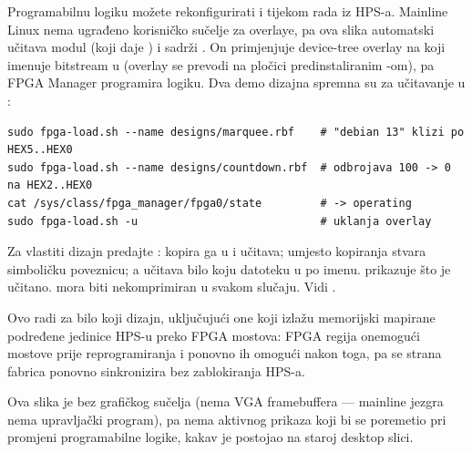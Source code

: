 \begin{note}
Programabilnu logiku možete rekonfigurirati i tijekom rada iz HPS-a. Mainline Linux
nema ugrađeno korisničko sučelje za overlaye, pa ova slika automatski učitava modul
 (koji daje ) i sadrži
. On primjenjuje device-tree overlay na
 koji imenuje bitstream u 
(overlay se prevodi na pločici predinstaliranim -om), pa FPGA Manager
programira logiku. Dva demo dizajna spremna su za učitavanje u
:
\begin{lstlisting}
sudo fpga-load.sh --name designs/marquee.rbf    # "debian 13" klizi po HEX5..HEX0
sudo fpga-load.sh --name designs/countdown.rbf  # odbrojava 100 -> 0 na HEX2..HEX0
cat /sys/class/fpga_manager/fpga0/state         # -> operating
sudo fpga-load.sh -u                            # uklanja overlay
\end{lstlisting}
Za vlastiti dizajn predajte : 
kopira ga u  i učitava;
 umjesto kopiranja stvara simboličku poveznicu; a
 učitava bilo koju datoteku u  po imenu.
 prikazuje što je učitano.  mora biti
nekomprimiran u svakom slučaju. Vidi .

Ovo radi za bilo koji dizajn, uključujući one koji izlažu memorijski mapirane
podređene jedinice HPS-u preko FPGA mostova: FPGA regija onemogući mostove prije
reprogramiranja i ponovno ih omogući nakon toga, pa se strana fabrica ponovno
sinkronizira bez zablokiranja HPS-a.
\end{note}
Ova slika je bez grafičkog sučelja (nema VGA framebuffera --- mainline jezgra nema
 upravljački program), pa nema aktivnog prikaza koji bi se poremetio
pri promjeni programabilne logike, kakav je postojao na staroj desktop slici.

